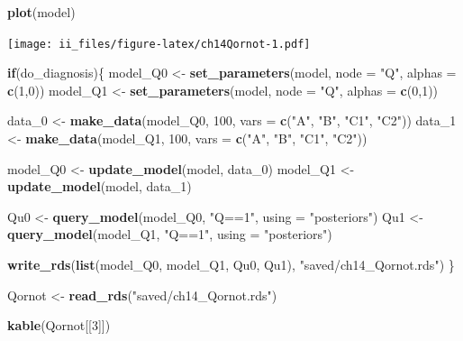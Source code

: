 \documentclass[
  12pt,
]{book}
\newenvironment{Shaded}{\begin{snugshade}}{\end{snugshade}}
\newcommand{\ControlFlowTok}[1]{\textcolor[rgb]{0.13,0.29,0.53}{\textbf{#1}}}
\newcommand{\DataTypeTok}[1]{\textcolor[rgb]{0.13,0.29,0.53}{#1}}
\newcommand{\DecValTok}[1]{\textcolor[rgb]{0.00,0.00,0.81}{#1}}
\newcommand{\KeywordTok}[1]{\textcolor[rgb]{0.13,0.29,0.53}{\textbf{#1}}}
\newcommand{\NormalTok}[1]{#1}
\newcommand{\StringTok}[1]{\textcolor[rgb]{0.31,0.60,0.02}{#1}}
\begin{document}
\begin{Shaded}
\begin{Highlighting}[]
\KeywordTok{plot}\NormalTok{(model)}
\end{Highlighting}
\end{Shaded}

\texttt{[image: ii\_files/figure-latex/ch14Qornot-1.pdf]}

\begin{Shaded}
\begin{Highlighting}[]
\ControlFlowTok{if}\NormalTok{(do_diagnosis)\{}
\NormalTok{  model_Q0 <-}\StringTok{ }\KeywordTok{set_parameters}\NormalTok{(model, }\DataTypeTok{node =} \StringTok{"Q"}\NormalTok{, }\DataTypeTok{alphas =} \KeywordTok{c}\NormalTok{(}\DecValTok{1}\NormalTok{,}\DecValTok{0}\NormalTok{))}
\NormalTok{  model_Q1 <-}\StringTok{ }\KeywordTok{set_parameters}\NormalTok{(model, }\DataTypeTok{node =} \StringTok{"Q"}\NormalTok{, }\DataTypeTok{alphas =} \KeywordTok{c}\NormalTok{(}\DecValTok{0}\NormalTok{,}\DecValTok{1}\NormalTok{))}
  
\NormalTok{  data_}\DecValTok{0}\NormalTok{ <-}\StringTok{ }\KeywordTok{make_data}\NormalTok{(model_Q0, }\DecValTok{100}\NormalTok{, }\DataTypeTok{vars =} \KeywordTok{c}\NormalTok{(}\StringTok{"A"}\NormalTok{, }\StringTok{"B"}\NormalTok{, }\StringTok{"C1"}\NormalTok{, }\StringTok{"C2"}\NormalTok{))}
\NormalTok{  data_}\DecValTok{1}\NormalTok{ <-}\StringTok{ }\KeywordTok{make_data}\NormalTok{(model_Q1, }\DecValTok{100}\NormalTok{, }\DataTypeTok{vars =} \KeywordTok{c}\NormalTok{(}\StringTok{"A"}\NormalTok{, }\StringTok{"B"}\NormalTok{, }\StringTok{"C1"}\NormalTok{, }\StringTok{"C2"}\NormalTok{))}
  
\NormalTok{  model_Q0 <-}\StringTok{ }\KeywordTok{update_model}\NormalTok{(model, data_}\DecValTok{0}\NormalTok{)}
\NormalTok{  model_Q1 <-}\StringTok{ }\KeywordTok{update_model}\NormalTok{(model, data_}\DecValTok{1}\NormalTok{)}

\NormalTok{Qu0 <-}\StringTok{ }\KeywordTok{query_model}\NormalTok{(model_Q0, }\StringTok{"Q==1"}\NormalTok{, }\DataTypeTok{using =} \StringTok{"posteriors"}\NormalTok{)}
\NormalTok{Qu1 <-}\StringTok{ }\KeywordTok{query_model}\NormalTok{(model_Q1, }\StringTok{"Q==1"}\NormalTok{, }\DataTypeTok{using =} \StringTok{"posteriors"}\NormalTok{)}

  \KeywordTok{write_rds}\NormalTok{(}\KeywordTok{list}\NormalTok{(model_Q0, model_Q1, Qu0, Qu1), }\StringTok{"saved/ch14_Qornot.rds"}\NormalTok{)}
\NormalTok{\}}

\NormalTok{Qornot <-}\StringTok{ }\KeywordTok{read_rds}\NormalTok{(}\StringTok{"saved/ch14_Qornot.rds"}\NormalTok{)}

\KeywordTok{kable}\NormalTok{(Qornot[[}\DecValTok{3}\NormalTok{]])}
\end{Highlighting}
\end{Shaded}
\end{document}
